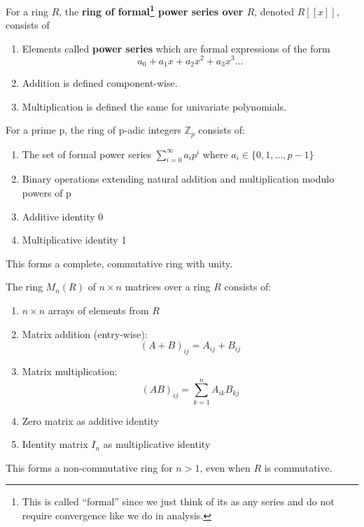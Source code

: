   \begin{definition}
    For a ring $R$, the \textbf{ring of formal\footnote{This is called ``formal'' since we just think of its as any series and do not require convergence like we do in analysis.} power series over $R$}, denoted $R[[x]]$, consists of 
    \begin{enumerate}
      \item Elements called \textbf{power series} which are formal expressions of the form 
      \begin{equation}
        a_0 + a_1 x + a_2 x^2 + a_3 x^3...
      \end{equation}

      \item Addition is defined component-wise. 

      \item Multiplication is defined the same for univariate polynomials. 
    \end{enumerate}
  \end{definition}

  \begin{definition}
    For a prime p, the ring of p-adic integers $\mathbb{Z}_p$ consists of:
    \begin{enumerate}
      \item The set of formal power series $\sum_{i=0}^{\infty} a_i p^i$ where $a_i \in \{0,1,\dots,p-1\}$
      \item Binary operations extending natural addition and multiplication modulo powers of p
      \item Additive identity 0
      \item Multiplicative identity 1
    \end{enumerate}
    This forms a complete, commutative ring with unity.
  \end{definition}

  \begin{definition}[Matrices]
    The ring $M_n(R)$ of $n \times n$ matrices over a ring $R$ consists of:
    \begin{enumerate}
      \item $n \times n$ arrays of elements from $R$
      \item Matrix addition (entry-wise):
      \begin{equation}
        (A + B)_{ij} = A_{ij} + B_{ij}
      \end{equation}
      \item Matrix multiplication:
      \begin{equation}
        (AB)_{ij} = \sum_{k=1}^n A_{ik}B_{kj}
      \end{equation}
      \item Zero matrix as additive identity
      \item Identity matrix $I_n$ as multiplicative identity
    \end{enumerate}
    This forms a non-commutative ring for $n > 1$, even when $R$ is commutative.
  \end{definition}

